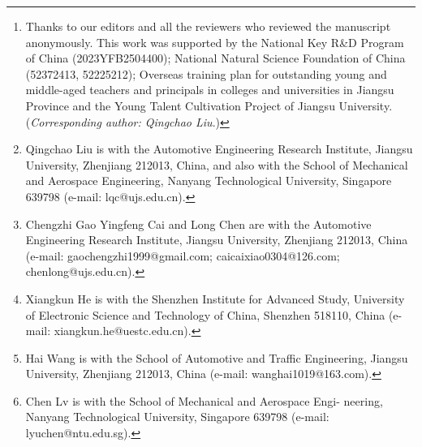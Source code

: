 \author{%
    Qingchao~Liu\textsuperscript{}, %
    Chengzhi~Gao\textsuperscript{}, %
    Xiangkun~He\textsuperscript{},~, %
    Hai~Wang\textsuperscript{},~, %
    Chen~Lv\textsuperscript{},~, %
    Yingfeng~Cai\textsuperscript{},~, 
    and~Long~Chen\textsuperscript{}
    \thanks{Thanks to our editors and all the reviewers who reviewed the manuscript anonymously. This work was supported by the National Key R\&D Program of China (2023YFB2504400); National Natural Science Foundation of China (52372413, 52225212); Overseas training plan for outstanding young and middle-aged teachers and principals in colleges and universities in Jiangsu Province and the Young Talent Cultivation Project of Jiangsu University. (\textit{Corresponding author: Qingchao Liu}.)}
    \thanks{Qingchao Liu is with the Automotive Engineering Research Institute, Jiangsu University, Zhenjiang 212013, China, and also with the School of Mechanical and Aerospace Engineering, Nanyang Technological University, Singapore 639798 (e-mail: lqc@ujs.edu.cn).}%
    \thanks{Chengzhi Gao Yingfeng Cai and Long Chen are with the Automotive Engineering Research Institute, Jiangsu University, Zhenjiang 212013, China (e-mail: gaochengzhi1999@gmail.com; caicaixiao0304@126.com; chenlong@ujs.edu.cn).}
    \thanks{Xiangkun He is with the Shenzhen Institute for Advanced Study, University of Electronic Science and Technology of China, Shenzhen 518110, China (e-mail: xiangkun.he@uestc.edu.cn).}
    \thanks{Hai Wang is with the School of Automotive and Traffic Engineering, Jiangsu University, Zhenjiang 212013, China (e-mail: wanghai1019@163.com).}
    \thanks{Chen Lv is with the School of Mechanical and Aerospace Engi- neering, Nanyang Technological University, Singapore 639798 (e-mail: lyuchen@ntu.edu.sg).}%

}

